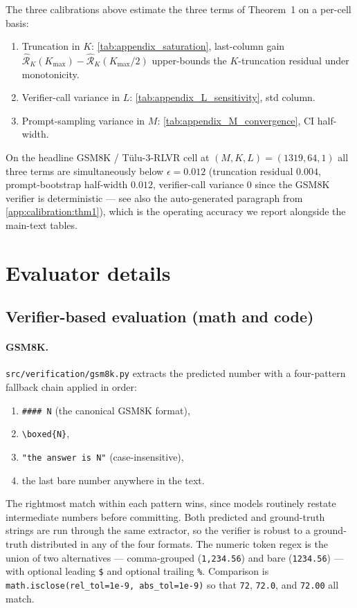 The three calibrations above estimate the three terms of Theorem~1
on a per-cell basis:
\begin{enumerate}
\item Truncation in $K$: \cref{tab:appendix_saturation}, last-column gain
      $\hat{\mathcal R}_K(K_{\max}) - \hat{\mathcal R}_K(K_{\max}/2)$ upper-bounds the
      $K$-truncation residual under monotonicity.
\item Verifier-call variance in $L$: \cref{tab:appendix_L_sensitivity}, std
      column.
\item Prompt-sampling variance in $M$: \cref{tab:appendix_M_convergence}, CI
      half-width.
\end{enumerate}
On the headline GSM8K / Tülu-3-RLVR cell at $(M, K, L) = (1319, 64, 1)$
all three terms are simultaneously below $\epsilon{=}0.012$ (truncation
residual $0.004$, prompt-bootstrap half-width $0.012$, verifier-call
variance $0$ since the GSM8K verifier is deterministic — see also the
auto-generated paragraph from \cref{app:calibration:thm1}), which is
the operating accuracy we report alongside the main-text tables.

\section{Evaluator details}
\label{app:evaluator}

\subsection{Verifier-based evaluation (math and code)}

\paragraph{GSM8K.}
\texttt{src/verification/gsm8k.py} extracts the predicted number with a
four-pattern fallback chain applied in order:
\begin{enumerate}
\item \texttt{\#\#\#\# N} (the canonical GSM8K format),
\item \texttt{\textbackslash boxed\{N\}},
\item \texttt{"the answer is N"} (case-insensitive),
\item the last bare number anywhere in the text.
\end{enumerate}
The rightmost match within each pattern wins, since models routinely
restate intermediate numbers before committing. Both predicted and
ground-truth strings are run through the same extractor, so the verifier
is robust to a ground-truth distributed in any of the four formats.
The numeric token regex is the union of two alternatives — comma-grouped
(\texttt{1,234.56}) and bare (\texttt{1234.56}) — with optional leading
\texttt{\$} and optional trailing \texttt{\%}. Comparison is
\texttt{math.isclose(rel\_tol=1e-9, abs\_tol=1e-9)} so that
\texttt{72}, \texttt{72.0}, and \texttt{72.00} all match.

